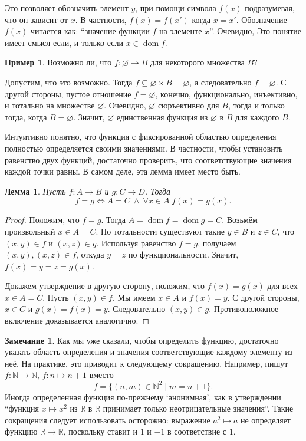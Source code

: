 \documentclass[12pt,notitlepage]{article}
\theoremstyle{plain}
\newtheorem{lemma}[thm]{Лемма}
\theoremstyle{definition}
\newtheorem{exm}[thm]{Пример}
\newtheorem{rem}[thm]{Замечание}
\theoremstyle{plain}
\newcommand{\N}{\mathbb{N}}
\newcommand{\R}{\mathbb{R}}
\newcommand{\sbs}{\subseteq}
\newcommand{\void}{\varnothing}
\newcommand{\dom}{\mathop{\mathrm{dom}}}
\newcommand{\1}{\mathbf{1}}
\newcommand{\0}{\mathbf{0}}
\begin{document}
Это позволяет обозначить элемент $y$, при помощи символа $f(x)$ подразумевая, что он зависит от $x$. В частности, $f(x) = f(x')$ когда $x = x'$. Обозначение $f(x)$ читается как: ``значение функции $f$ на элементе $x$''. Очевидно, Это понятие имеет смысл если, и только если $x \in \dom f$.


\begin{exm}\label{ch0:void_fnc}
	Возможно ли, что $f\colon \void \to B$ для некоторого множества $B$?
	
	Допустим, что это возможно. Тогда $f \sbs \void \times B = \void$, а следовательно $f = \void$. С другой стороны, пустое отношение $f = \void$, конечно, функционально, инъективно, и тотально на множестве $\void$. Очевидно, $\void$ сюръективно для $B$, тогда и только тогда, когда $B = \void$. Значит, $\void$ единственная функция из $\void$ в $B$ для каждого $B$.
\end{exm}
Интуитивно понятно, что функция с фиксированной областью определения полностью определяется своими значениями. В частности, чтобы установить равенство двух функций, достаточно проверить, что соответствующие значения каждой точки равны. В самом деле, эта лемма имеет место быть.
\begin{lemma}\label{ch0:tot_fnc_cmp}
	Пусть $f\colon A \to B$ и $g\colon C \to D$. Тогда
	$$f = g \iff A = C\ \wedge\ \forall x \in A\; f(x) = g(x).$$
\end{lemma}
\begin{proof}
	Положим, что $f = g$. Тогда $A = \dom f = \dom g = C$. Возьмём произвольный $x \in A = C$. По тотальности существуют такие $y \in B$ и $z \in C$, что $(x,y) \in f$ и $(x,z) \in g$. Используя равенство $f = g$, получаем $(x, y), (x, z) \in f$, откуда $y = z$ по функциональности. Значит, $f(x) = y = z = g(x)$.
	
	Докажем утверждение в другую сторону, положим, что $f(x) = g(x)$ для всех $x \in A = C$. Пусть $(x,y) \in f$. Мы имеем $x \in A$ и $f(x) = y$. С другой стороны, $x \in C$ и $g(x) = f(x) = y$. Следовательно $(x,y) \in g$. Противоположное включение доказывается аналогично.
\end{proof}

\begin{rem}
	Как мы уже сказали, чтобы определить функцию, достаточно указать область определения и значения соответствующие каждому элементу из неё. На практике, это приводит к следующему сокращению. Например, пишут $f\colon \N \to \N$, $f\colon n \mapsto n + 1$ вместо
	$$f = \{(n,m) \in \N^2 \mid m = n + 1 \}.$$
	Иногда определенная функция по-прежнему `анонимная', как в утверждении ``функция $x \mapsto x^2$ из $\R$ в $\R$ принимает только неотрицательные значения''. Такие сокращения следует использовать осторожно: выражение $a^2 \mapsto a$ не определяет функцию $\R \to \R$, поскольку ставит и $1$ и $-1$ в соответствие с $1$. 
\end{rem}
\end{document}
